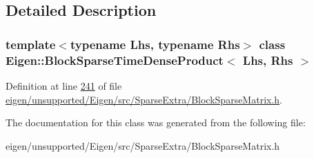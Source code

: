 \subsection{Detailed Description}
\subsubsection*{template$<$typename Lhs, typename Rhs$>$\newline
class Eigen\+::\+Block\+Sparse\+Time\+Dense\+Product$<$ Lhs, Rhs $>$}



Definition at line \hyperlink{eigen_2unsupported_2_eigen_2src_2_sparse_extra_2_block_sparse_matrix_8h_source_l00241}{241} of file \hyperlink{eigen_2unsupported_2_eigen_2src_2_sparse_extra_2_block_sparse_matrix_8h_source}{eigen/unsupported/\+Eigen/src/\+Sparse\+Extra/\+Block\+Sparse\+Matrix.\+h}.



The documentation for this class was generated from the following file\+:\begin{DoxyCompactItemize}
\item 
eigen/unsupported/\+Eigen/src/\+Sparse\+Extra/\+Block\+Sparse\+Matrix.\+h\end{DoxyCompactItemize}
